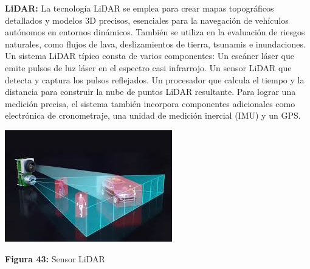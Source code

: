 \vspace{10mm}
\textbf{LiDAR:}
La tecnología LiDAR se emplea para crear mapas topográficos detallados y modelos 3D precisos, esenciales para la navegación de vehículos autónomos en entornos dinámicos. También se utiliza en la evaluación de riesgos naturales, como flujos de lava, deslizamientos de tierra, tsunamis e inundaciones.
Un sistema LiDAR típico consta de varios componentes:
Un escáner láser que emite pulsos de luz láser en el espectro casi infrarrojo.
Un sensor LiDAR que detecta y captura los pulsos reflejados.
Un procesador que calcula el tiempo y la distancia para construir la nube de puntos LiDAR resultante.
Para lograr una medición precisa, el sistema también incorpora componentes adicionales como electrónica de cronometraje, una unidad de medición inercial (IMU) y un GPS.
\vspace{10pt}  %

\vspace{5mm}

\begin{center}
	\includegraphics[width=0.3\linewidth]{img/lidar}
	
	\vspace{2mm} %
	
	\textbf{Figura 43:} Sensor LiDAR
\end{center}
\newpage  %


